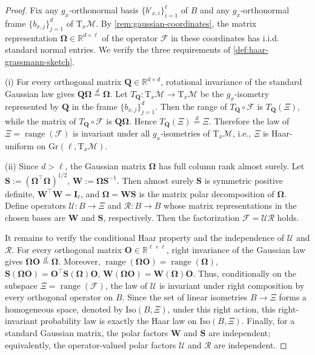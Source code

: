 \documentclass[final,onefignum,onetabnum]{siamart250211}
\begin{document}
\begin{proof}
Fix any $g_x$-orthonormal basis $\{b'_{x,i}\}_{i=1}^{\ell}$ of $B$ and any $g_x$-orthonormal frame $\{b_{x,j}\}_{j=1}^{d}$ of $\mathrm T_x\mathcal M$.
By \cref{rem:gaussian-coordinates}, the matrix representation $\mathbf{\Omega}\in\mathbb R^{d\times \ell}$ of the operator $\mathcal F$ in these coordinates has i.i.d. standard normal entries. We verify the three requirements of \cref{def:haar-grassmann-sketch}.

\noindent(i) For every orthogonal matrix $\mathbf{Q}\in\mathbb R^{d\times d}$, rotational invariance of the standard Gaussian law gives
$
\mathbf{Q}\mathbf{\Omega}\stackrel{d}{=}\mathbf{\Omega}.
$
Let $T_{\mathbf Q}:\mathrm T_x\mathcal M\to\mathrm T_x\mathcal M$ be the $g_x$-isometry represented by $\mathbf Q$ in the frame $\{b_{x,j}\}_{j=1}^d$.
Then the range of $T_{\mathbf Q}\circ \mathcal F$ is $T_{\mathbf Q}(\Xi)$, while the matrix of $T_{\mathbf Q}\circ \mathcal F$ is $\mathbf Q\mathbf\Omega$.
Hence
$
T_{\mathbf Q}(\Xi)\stackrel{d}{=}\Xi.
$
Therefore the law of $\Xi=\operatorname{range}(\mathcal F)$ is invariant under all $g_x$-isometries of $\mathrm T_x\mathcal M$, i.e., $\Xi$ is Haar-uniform on $\mathrm{Gr}(\ell,\mathrm T_x\mathcal M)$.

\noindent(ii) Since $d > \ell$, the Gaussian matrix $\mathbf\Omega$ has full column rank almost surely. Let
$
\mathbf S:=(\mathbf\Omega^{\top}\mathbf\Omega)^{1/2}$,
$
\mathbf W:=\mathbf\Omega\mathbf S^{-1}.
$
Then almost surely $\mathbf S$ is symmetric positive definite, $\mathbf W^{\top}\mathbf W=\mathbf I_{\ell}$, and
$
\mathbf\Omega=\mathbf W\mathbf S
$
is the matrix polar decomposition of $\mathbf\Omega$.
Define operators $\mathcal U:B\to \Xi$ and $\mathcal R:B\to B$  whose matrix representations in the chosen bases are $\mathbf W$ and $\mathbf S$, respectively. Then the factorization $\mathcal F=\mathcal U\mathcal R$ holds.

It remains to verify the conditional Haar property and the independence of $\mathcal U$ and $\mathcal R$.
For every orthogonal matrix $\mathbf O\in\mathbb R^{\ell\times \ell}$, right invariance of the Gaussian law gives
$
\mathbf\Omega\mathbf O\stackrel{d}{=}\mathbf\Omega.
$
Moreover,
$
\operatorname{range}(\mathbf\Omega\mathbf O)=\operatorname{range}(\mathbf\Omega)$,
$
\mathbf S(\mathbf\Omega\mathbf O)=\mathbf O^{\top}\mathbf S(\mathbf\Omega)\mathbf O$,
$
\mathbf W(\mathbf\Omega\mathbf O)=\mathbf W(\mathbf\Omega)\mathbf O$.
Thus, conditionally on the subspace $\Xi=\operatorname{range}(\mathcal F)$, the law of $\mathcal U$ is invariant under right composition by every orthogonal operator on $B$.
Since the set of linear isometries $B\to \Xi$ forms a homogeneous space, denoted by $\mathrm{Iso}(B,\Xi)$, under this right action, this right-invariant probability law is exactly the Haar law on $\mathrm{Iso}(B,\Xi)$.
Finally, for a standard Gaussian matrix, the polar factors $\mathbf W$ and $\mathbf S$ are independent; equivalently, the operator-valued polar factors $\mathcal U$ and $\mathcal R$ are independent.


\end{proof}
\end{document}

